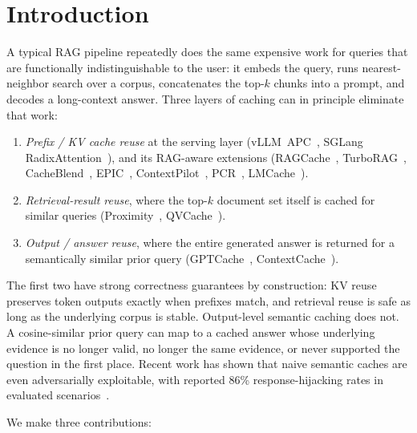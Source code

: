 \documentclass[11pt]{article}
\begin{document}
\section{Introduction}
A typical RAG pipeline repeatedly does the same expensive work for queries
that are functionally indistinguishable to the user: it embeds the query,
runs nearest-neighbor search over a corpus, concatenates the top-$k$ chunks
into a prompt, and decodes a long-context answer. Three layers of caching
can in principle eliminate that work:

\begin{enumerate}
    \item \emph{Prefix / KV cache reuse} at the serving layer
          (vLLM~APC~\citep{vllm-apc}, SGLang RadixAttention~\citep{zheng2024sglang}),
          and its RAG-aware extensions
          (RAGCache~\citep{ragcache}, TurboRAG~\citep{turborag},
           CacheBlend~\citep{cacheblend}, EPIC~\citep{epic},
           ContextPilot~\citep{contextpilot}, PCR~\citep{pcr},
           LMCache~\citep{lmcache}).
    \item \emph{Retrieval-result reuse}, where the top-$k$ document set
          itself is cached for similar queries
          (Proximity~\citep{proximity}, QVCache~\citep{qvcache}).
    \item \emph{Output / answer reuse}, where the entire generated answer
          is returned for a semantically similar prior query
          (GPTCache~\citep{gptcache}, ContextCache~\citep{contextcache}).
\end{enumerate}

The first two have strong correctness guarantees by construction: KV reuse
preserves token outputs exactly when prefixes match, and retrieval reuse is
safe as long as the underlying corpus is stable. Output-level semantic
caching does not. A cosine-similar prior query can map to a cached answer
whose underlying evidence is no longer valid, no longer the same evidence,
or never supported the question in the first place. Recent work has shown
that naive semantic caches are even adversarially exploitable, with reported
86\% response-hijacking rates in evaluated scenarios~\citep{semcache-attack}.

We make three contributions:
\end{document}
